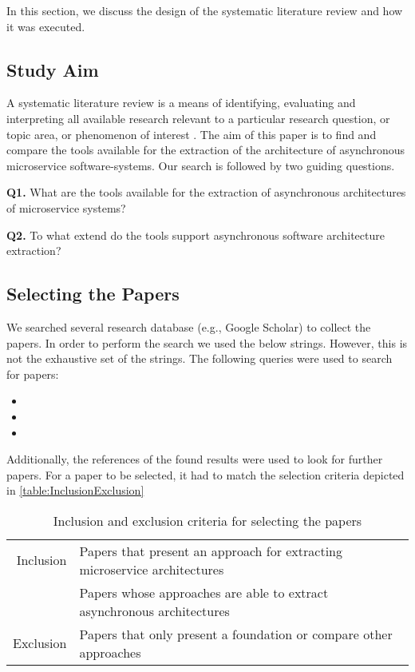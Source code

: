 In this section, we discuss the design of the systematic literature review and how it was executed.

\subsection{Study Aim}
\label{sec:StudyDesign:StudyAim}
A systematic literature review is a means of identifying, evaluating and interpreting all available research relevant to a particular research question, or topic area, or phenomenon of interest \cite{Keele2007guidelines}.
The aim of this paper is to find and compare the tools available for the extraction of the architecture of asynchronous microservice software-systems.
Our search is followed by two guiding questions.

\textbf{Q1.} What are the tools available for the extraction of asynchronous architectures of microservice systems?

\textbf{Q2.} To what extend do the tools support asynchronous software architecture extraction?

\subsection{Selecting the Papers}
\label{sec:StudyDesign:SelectingPapers}
We searched several research database (e.g., Google Scholar) to collect the papers.
In order to perform the search we used the below strings.
However, this is not the exhaustive set of the strings.
The following queries were used to search for papers:
\begin{itemize}
	\item {}
	\item {}
	\item {}
\end{itemize}

Additionally, the references of the found results were used to look for further papers.
For a paper to be selected, it had to match the selection criteria depicted in \autoref{table:InclusionExclusion}


\begin{table}
\centering
\begin{tabular}{r l}
\toprule
Inclusion
& Papers that present an approach for extracting microservice architectures \\
& Papers whose approaches are able to extract asynchronous architectures \\
\midrule
Exclusion
& Papers that only present a foundation or compare other approaches \\
\bottomrule
\end{tabular}
\caption{Inclusion and exclusion criteria for selecting the papers}
\label{table:InclusionExclusion}
\end{table}


